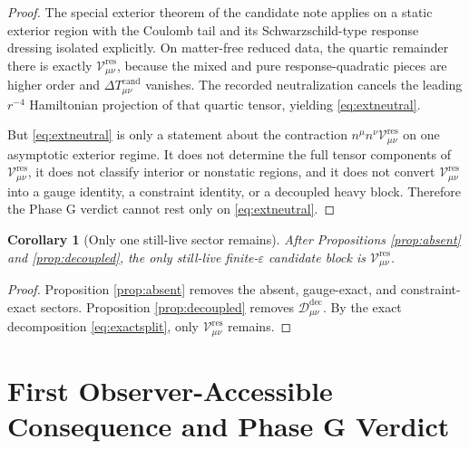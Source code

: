 \documentclass[11pt]{article}
\newcommand{\DeltaTCand}{\Delta T_{\mu\nu}^{\mathrm{cand}}}
\newcommand{\ResidualCore}{\mathcal V_{\mu\nu}^{\mathrm{res}}}
\newcommand{\ResidualDec}{\mathcal D_{\mu\nu}^{\mathrm{dec}}}
\newcommand{\epsIR}{\varepsilon}
\newtheorem{corollary}{Corollary}
\begin{document}
\begin{proof}
The special exterior theorem of the candidate note applies on a static exterior region with the Coulomb tail and its Schwarzschild-type response dressing isolated explicitly. On matter-free reduced data, the quartic remainder there is exactly \(\ResidualCore\), because the mixed and pure response-quadratic pieces are higher order and \(\DeltaTCand\) vanishes. The recorded neutralization cancels the leading \(r^{-4}\) Hamiltonian projection of that quartic tensor, yielding \eqref{eq:extneutral}.

But \eqref{eq:extneutral} is only a statement about the contraction \(n^\mu n^\nu \ResidualCore\) on one asymptotic exterior regime. It does not determine the full tensor components of \(\ResidualCore\), it does not classify interior or nonstatic regions, and it does not convert \(\ResidualCore\) into a gauge identity, a constraint identity, or a decoupled heavy block. Therefore the Phase G verdict cannot rest only on \eqref{eq:extneutral}.
\end{proof}

\begin{corollary}[Only one still-live sector remains]
\label{cor:oneleft}
After Propositions \ref{prop:absent} and \ref{prop:decoupled}, the only still-live finite-\(\epsIR\) candidate block is \(\ResidualCore\).
\end{corollary}

\begin{proof}
Proposition \ref{prop:absent} removes the absent, gauge-exact, and constraint-exact sectors. Proposition \ref{prop:decoupled} removes \(\ResidualDec\). By the exact decomposition \eqref{eq:exactsplit}, only \(\ResidualCore\) remains.
\end{proof}

\section{First Observer-Accessible Consequence and Phase G Verdict}
\end{document}
